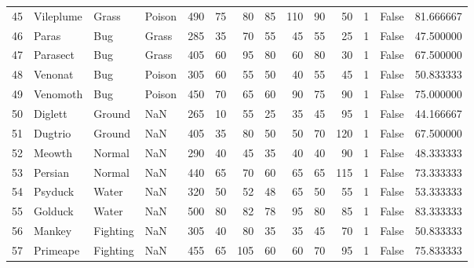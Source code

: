\begin{tabular}{rlllrrrrrrrrlr}
  45 &                  Vileplume &     Grass &    Poison &    490 &   75 &      80 &       85 &      110 &       90 &     50 &           1 &      False &   81.666667 \\
  46 &                      Paras &       Bug &     Grass &    285 &   35 &      70 &       55 &       45 &       55 &     25 &           1 &      False &   47.500000 \\
  47 &                   Parasect &       Bug &     Grass &    405 &   60 &      95 &       80 &       60 &       80 &     30 &           1 &      False &   67.500000 \\
  48 &                    Venonat &       Bug &    Poison &    305 &   60 &      55 &       50 &       40 &       55 &     45 &           1 &      False &   50.833333 \\
  49 &                   Venomoth &       Bug &    Poison &    450 &   70 &      65 &       60 &       90 &       75 &     90 &           1 &      False &   75.000000 \\
  50 &                    Diglett &    Ground &       NaN &    265 &   10 &      55 &       25 &       35 &       45 &     95 &           1 &      False &   44.166667 \\
  51 &                    Dugtrio &    Ground &       NaN &    405 &   35 &      80 &       50 &       50 &       70 &    120 &           1 &      False &   67.500000 \\
  52 &                     Meowth &    Normal &       NaN &    290 &   40 &      45 &       35 &       40 &       40 &     90 &           1 &      False &   48.333333 \\
  53 &                    Persian &    Normal &       NaN &    440 &   65 &      70 &       60 &       65 &       65 &    115 &           1 &      False &   73.333333 \\
  54 &                    Psyduck &     Water &       NaN &    320 &   50 &      52 &       48 &       65 &       50 &     55 &           1 &      False &   53.333333 \\
  55 &                    Golduck &     Water &       NaN &    500 &   80 &      82 &       78 &       95 &       80 &     85 &           1 &      False &   83.333333 \\
  56 &                     Mankey &  Fighting &       NaN &    305 &   40 &      80 &       35 &       35 &       45 &     70 &           1 &      False &   50.833333 \\
  57 &                   Primeape &  Fighting &       NaN &    455 &   65 &     105 &       60 &       60 &       70 &     95 &           1 &      False &   75.833333 \\

\end{tabular}
